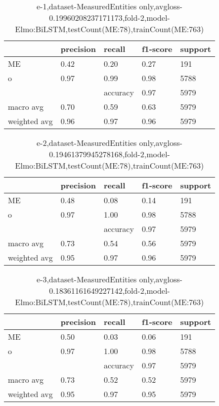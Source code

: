 \begin{table}[!ht] 
\centering
\caption{e-1,dataset-MeasuredEntities only,avgloss-0.19960208237171173,fold-2,model-Elmo:BiLSTM,testCount(ME:78),trainCount(ME:763)}\label{e-1data-meS.tsv}
\begin{tabularx}{300pt}{|X|X|X|X|X|}
\hline
&precision&recall&f1-score&support\\
\hline
ME&0.42&0.20&0.27&191\\
\hline
o&0.97&0.99&0.98&5788\\
\hline
&&accuracy&0.97&5979\\
\hline
macro avg&0.70&0.59&0.63&5979\\
\hline
weighted avg&0.96&0.97&0.96&5979\\
\hline
\end{tabularx}
\end{table}
\begin{table}[!ht] 
\centering
\caption{e-2,dataset-MeasuredEntities only,avgloss-0.19461379945278168,fold-2,model-Elmo:BiLSTM,testCount(ME:78),trainCount(ME:763)}\label{e-2data-meS.tsv}
\begin{tabularx}{300pt}{|X|X|X|X|X|}
\hline
&precision&recall&f1-score&support\\
\hline
ME&0.48&0.08&0.14&191\\
\hline
o&0.97&1.00&0.98&5788\\
\hline
&&accuracy&0.97&5979\\
\hline
macro avg&0.73&0.54&0.56&5979\\
\hline
weighted avg&0.95&0.97&0.96&5979\\
\hline
\end{tabularx}
\end{table}
\begin{table}[!ht] 
\centering
\caption{e-3,dataset-MeasuredEntities only,avgloss-0.18361161649227142,fold-2,model-Elmo:BiLSTM,testCount(ME:78),trainCount(ME:763)}\label{e-3data-meS.tsv}
\begin{tabularx}{300pt}{|X|X|X|X|X|}
\hline
&precision&recall&f1-score&support\\
\hline
ME&0.50&0.03&0.06&191\\
\hline
o&0.97&1.00&0.98&5788\\
\hline
&&accuracy&0.97&5979\\
\hline
macro avg&0.73&0.52&0.52&5979\\
\hline
weighted avg&0.95&0.97&0.95&5979\\
\hline
\end{tabularx}
\end{table}

